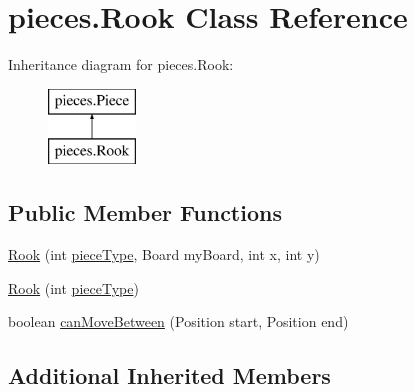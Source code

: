 \hypertarget{classpieces_1_1_rook}{\section{pieces.\-Rook Class Reference}
\label{classpieces_1_1_rook}
}
Inheritance diagram for pieces.\-Rook\-:\begin{figure}[H]
\begin{center}
\leavevmode
\includegraphics[height=2.000000cm]{classpieces_1_1_rook}
\end{center}
\end{figure}
\subsection*{Public Member Functions}
\begin{DoxyCompactItemize}
\item 
\hyperlink{classpieces_1_1_rook_a09c7380bb0b1e18f5e2b63a494c559f0}{Rook} (int \hyperlink{classpieces_1_1_piece_ae40d6201d0aed36f369dd9d8f55892e3}{piece\-Type}, Board my\-Board, int x, int y)
\item 
\hyperlink{classpieces_1_1_rook_ad49559ea874f947761af67e428098500}{Rook} (int \hyperlink{classpieces_1_1_piece_ae40d6201d0aed36f369dd9d8f55892e3}{piece\-Type})
\item 
boolean \hyperlink{classpieces_1_1_rook_a79a453f36c4582ccadbdc1ea5e01d5ad}{can\-Move\-Between} (Position start, Position end)
\end{DoxyCompactItemize}
\subsection*{Additional Inherited Members}


